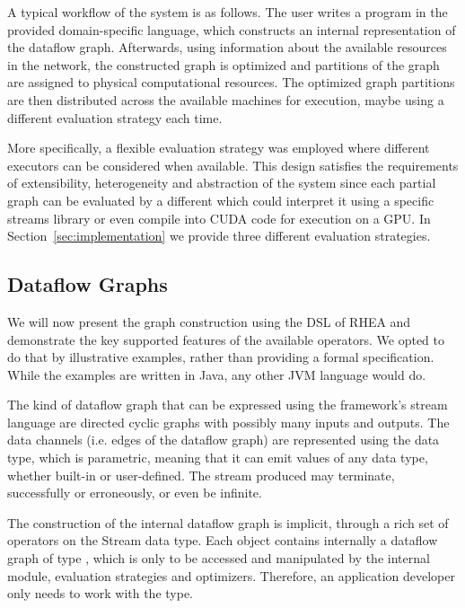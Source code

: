 \documentclass[sigplan,screen,10pt]{acmart}
\begin{document}
A typical workflow of the system is as follows. The user writes a program in
the provided domain-specific language, which constructs an internal representation
of the dataflow graph. Afterwards, using information about the available
resources in the network, the constructed graph is optimized and partitions of the
graph are assigned to physical computational resources. The optimized graph partitions are
then distributed across the available machines for execution, maybe using a
different evaluation strategy each time.

More specifically, a flexible evaluation strategy was employed where different
executors can be considered when available. This design satisfies the requirements
of extensibility, heterogeneity and abstraction of the system since each partial
graph can be evaluated by a different  which could
interpret it using a specific streams library or even compile into CUDA code
for execution on a GPU. In Section~\ref{sec:implementation} we provide three
different evaluation strategies.

\subsection{Dataflow Graphs}

We will now present the graph construction using the DSL of RHEA and
demonstrate the key supported features of the available operators. We opted to
do that by illustrative examples, rather than providing a formal specification.
While the examples are written in Java, any other JVM language would do.

The kind of dataflow graph that can be expressed using the framework's stream
language are directed cyclic graphs with possibly many inputs and outputs.
%
The data channels (i.e. edges of the dataflow graph) are represented using the
 data type, which is parametric, meaning that it can emit values
of any data type, whether built-in or user-defined. The stream produced may
terminate, successfully or erroneously, or even be infinite.

The construction of the internal dataflow graph is implicit, through a
rich set of operators on the Stream data type. Each  object
contains internally a dataflow graph of type , which is only
to be accessed and manipulated by the internal module, evaluation strategies and
optimizers. Therefore, an application developer only needs to work with the
 type.
\end{document}
